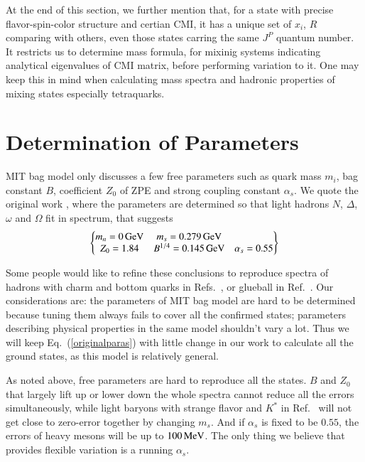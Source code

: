 \documentclass[prd,twocolumn,floatfix,nofootinbib]{revtex4}
\begin{document}
At the end of this section, we further mention that, for a state with precise flavor-spin-color structure and certian CMI, it has a unique set of $x_{i}$, $R$ comparing with others, even those states carring the same $J^{P}$ quantum number.
It restricts us to determine mass formula, for mixinig systems indicating analytical eigenvalues of CMI matrix, before performing variation to it.
One may keep this in mind when calculating mass spectra and hadronic properties of mixing states especially tetraquarks.


\section{Determination of Parameters}\label{Parameters}
MIT bag model only discusses a few free parameters such as quark mass $m_{i}$, bag constant $B$, coefficient $Z_{0}$ of ZPE and strong coupling constant $\alpha_{s}$.
We quote the original work \cite{Johnson:1975zp}, where the parameters are determined so that light hadrons $N$, $\Delta$, $\omega$ and $\Omega$ fit in spectrum, that suggests 
\begin{equation}\label{originalparas}
    \begin{Bmatrix}
        m_{n}=0\,{\rm GeV} & m_{s}=0.279\,{\rm GeV} \\
        Z_{0}=1.84 & B^{1/4}=0.145\,{\rm GeV} & \alpha_{s}=0.55
    \end{Bmatrix}
\end{equation}

Some people would like to refine these conclusions to reproduce spectra of hadrons with charm and bottom quarks 
in Refs.~\cite{Haxton:1980mc,Aerts:1980rf,Fleck:1989mb,He:2004px}, or glueball in Ref.~\cite{Carlson:1982er}.
Our considerations are: the parameters of MIT bag model are hard to be determined because tuning them always fails to cover all the confirmed states;
parameters describing physical properties in the same model shouldn't vary a lot.
Thus we will keep Eq.~(\ref{originalparas}) with little change in our work to calculate all the ground states, as this model is relatively general.

As noted above, free parameters are hard to reproduce all the states.
$B$ and $Z_{0}$ that largely lift up or lower down the whole spectra cannot reduce all the errors simultaneously, 
while light baryons with strange flavor and $K^{\ast}$ in Ref.~\cite{Johnson:1975zp} will not get close to zero-error together by changing $m_{s}$.
And if $\alpha_{s}$ is fixed to be $0.55$, the errors of heavy mesons will be up to $100\,{\rm MeV}$.
The only thing we believe that provides flexible variation is a running $\alpha_{s}$.
\end{document}

